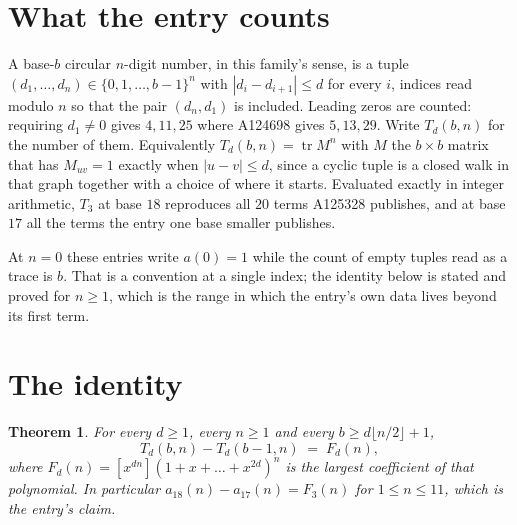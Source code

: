 \documentclass[11pt,a4paper]{article}
\theoremstyle{plain}
\newtheorem{theorem}{Theorem}
\theoremstyle{definition}
\begin{document}
\section{What the entry counts}

A base-$b$ circular $n$-digit number, in this family's sense, is a tuple
$(d_1,\dots,d_n)\in\{0,1,\dots,b-1\}^{n}$ with $|d_i-d_{i+1}|\le d$ for every $i$, indices
read modulo $n$ so that the pair $(d_n,d_1)$ is included. Leading zeros are counted: requiring
$d_1\ne0$ gives $4,11,25$ where A124698 gives $5,13,29$. Write $T_d(b,n)$ for the number of
them. Equivalently $T_d(b,n)=\operatorname{tr}M^{n}$ with $M$ the $b\times b$ matrix that has
$M_{uv}=1$ exactly when $|u-v|\le d$, since a cyclic tuple is a closed walk in that graph
together with a choice of where it starts. Evaluated exactly in integer arithmetic, $T_{3}$
at base $18$ reproduces all $20$ terms A125328 publishes, and at base $17$ all the
terms the entry one base smaller publishes.

At $n=0$ these entries write $a(0)=1$ while the count of empty tuples read as a trace is $b$.
That is a convention at a single index; the identity below is stated and proved for $n\ge1$,
which is the range in which the entry's own data lives beyond its first term.

\section{The identity}

\begin{theorem}
For every $d\ge1$, every $n\ge1$ and every $b\ge d\lfloor n/2\rfloor+1$,
\[
T_d(b,n)-T_d(b-1,n)\;=\;F_d(n),
\]
where $F_d(n)=[x^{dn}](1+x+\dots+x^{2d})^{n}$ is the largest coefficient of that
polynomial. In particular $a_{18}(n)-a_{17}(n)=F_{3}(n)$ for $1\le n\le11$, which
is the entry's claim.
\end{theorem}
\end{document}
